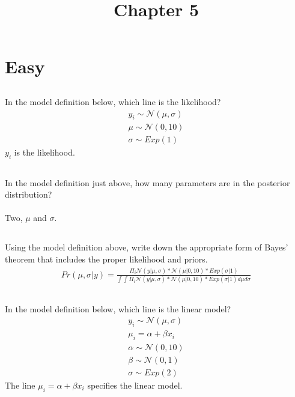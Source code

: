 \documentclass{article}
\begin{document}
\title{Chapter 5}

\section{Easy}

\subsection{}
In the model definition below, which line is the likelihood?
\begin{gather}
    y_i \sim \mathcal{N}(\mu, \sigma) \\
    \mu \sim \mathcal{N}(0, 10) \\
    \sigma \sim Exp(1)
\end{gather}
$y_i$ is the likelihood.

\subsection{}
In the model definition just above, how many parameters are in the posterior distribution? \\~\\
Two, $\mu$ and $\sigma$.

\subsection{}
Using the model definition above, write down the appropriate form of Bayes’ theorem
that includes the proper likelihood and priors.
\begin{gather}
    Pr(\mu, \sigma|y) = 
    \frac{\Pi_i \mathcal{N}(y|\mu, \sigma) * \mathcal{N}(\mu|0, 10) * Exp(\sigma|1)}
    {\int \int \Pi_i \mathcal{N}(y|\mu, \sigma) * \mathcal{N}(\mu|0, 10) * Exp(\sigma|1) d\mu d\sigma}
\end{gather}

\subsection{}
In the model definition below, which line is the linear model?
\begin{gather}
    y_i \sim \mathcal{N}(\mu, \sigma) \\
    \mu_i = \alpha + \beta x_i \\
    \alpha \sim \mathcal{N}(0, 10) \\
    \beta \sim \mathcal{N}(0, 1) \\
    \sigma \sim Exp(2)
\end{gather}
The line $\mu_i = \alpha + \beta x_i$ specifies the linear model.
\end{document}
